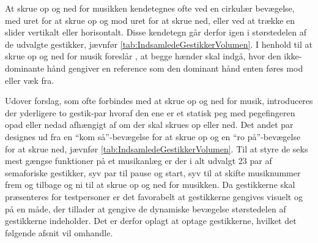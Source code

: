 \noindent
%
At skrue op og ned for musikken kendetegnes ofte ved en cirkulær bevægelse, med uret for at skrue op og mod uret for at skrue ned, eller ved at trække en slider vertikalt eller horisontalt. Disse kendetegn går derfor igen i størstedelen af de udvalgte gestikker, jævnfør \autoref{tab:IndsamledeGestikkerVolumen}. I henhold til at skrue op og ned for musik foreslår \textcite[s. 48]{PDF:UserDefinedGesturesTV}, at begge hænder skal indgå, hvor den ikke-dominante hånd gengiver en reference som den dominant hånd enten føres mod eller væk fra.

Udover forslag, som ofte forbindes med at skrue op og ned for musik, introduceres der yderligere to gestik-par hvoraf den ene er et statisk peg med pegefingeren opad eller nedad afhængigt af om der skal skrues op eller ned. Det andet par designes ud fra en \enquote{kom så}-bevægelse for at skrue op og en \enquote{ro på}-bevægelse for at skrue ned, jævnfør \autoref{tab:IndsamledeGestikkerVolumen}. \blankline
%
Til at styre de seks mest gængse funktioner på et musikanlæg er der i alt udvalgt 23 par af semaforiske gestikker, syv par til pause og start, syv til at skifte musiknummer frem og tilbage og ni til at skrue op og ned for musikken. Da gestikkerne skal præsenteres for testpersoner er det favorabelt at gestikkerne gengives visuelt og på en måde, der tillader at gengive de dynamiske bevægelse størstedelen af gestikkerne indeholder. Det er derfor oplagt at optage gestikkerne, hvilket det følgende afsnit vil omhandle. 
%
